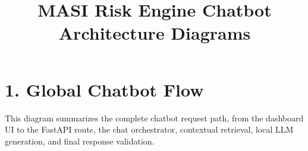 \documentclass[11pt,a4paper,landscape]{article}
\title{\vspace*{-8mm}\textbf{MASI Risk Engine Chatbot Architecture Diagrams}}
\author{}
\date{}
\begin{document}
\maketitle
\vspace*{-10mm}

\section*{1. Global Chatbot Flow}

{\small
This diagram summarizes the complete chatbot request path, from the dashboard UI to the FastAPI route, the chat orchestrator, contextual retrieval, local LLM generation, and final response validation.
}

\vspace{2mm}
\end{document}
